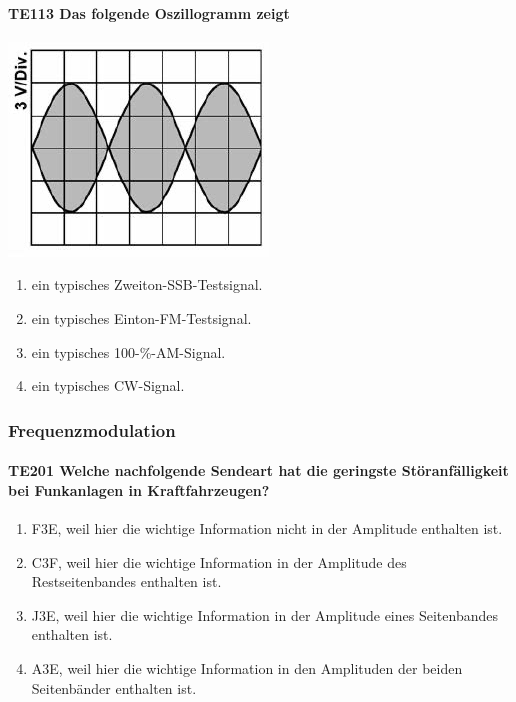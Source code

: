 \documentclass[8pt]{article}
\begin{document}
\begin{enumerate}
\begin{enumerate}[nolistsep,label=\Alph*]
\paragraph*{TE113 Das folgende Oszillogramm zeigt}
\begin{center}
	\begin{minipage}{\linewidth}
		\centering
		\includegraphics[scale=1.0]{pics/te113_a.jpg}
	\end{minipage}
\end{center}
\begin{enumerate}[nolistsep,label=\Alph*]
\item ein typisches Zweiton-SSB-Testsignal.
\item ein typisches Einton-FM-Testsignal.
\item ein typisches 100-\%-AM-Signal.
\item ein typisches CW-Signal.
\end{enumerate}

\pagebreak
\subsubsection{Frequenzmodulation}
\paragraph*{TE201 Welche nachfolgende Sendeart hat die geringste Störanfälligkeit bei Funkanlagen in Kraftfahrzeugen?}
\begin{enumerate}[nolistsep,label=\Alph*]
\item F3E, weil hier die wichtige Information nicht in der Amplitude enthalten ist. 
\item C3F, weil hier die wichtige Information in der Amplitude des Restseitenbandes enthalten ist.
\item J3E, weil hier die wichtige Information in der Amplitude eines Seitenbandes enthalten ist.
\item A3E, weil hier die wichtige Information in den Amplituden der beiden Seitenbänder enthalten ist.
\end{enumerate}


\end{enumerate}
\end{enumerate}
\end{document}
